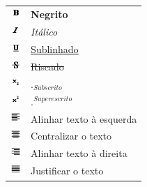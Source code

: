\begin{table}
\begin{center}
 \begin{tabular}{m{0.5cm} m{6.0cm}} \\
  \includegraphics[width=0.4cm]{imagem/cap0/bold.jpg} & \textbf{Negrito} \\
  \includegraphics[width=0.4cm]{imagem/cap0/italic.jpg} & \textit{Itálico} \\
  \includegraphics[width=0.4cm]{imagem/cap0/underline.jpg} & \underline{Sublinhado} \\
  \includegraphics[width=0.4cm]{imagem/cap0/strike.jpg} & \sout{Riscado} \\
  \includegraphics[width=0.4cm]{imagem/cap0/sub.jpg} & $._{Subscrito}$ \\
  \includegraphics[width=0.4cm]{imagem/cap0/sup.jpg} & $.^{Superescrito}$ \\ 
  \includegraphics[width=0.4cm]{imagem/cap0/align_left.jpg} & Alinhar texto à esquerda \\
  \includegraphics[width=0.4cm]{imagem/cap0/align_center.jpg} & Centralizar o texto \\
  \includegraphics[width=0.4cm]{imagem/cap0/align_right.jpg} & Alinhar texto à direita \\ 
  \includegraphics[width=0.4cm]{imagem/cap0/align_justify.jpg} & Justificar o texto \\

\end{tabular}
\end{center}
\end{table}
